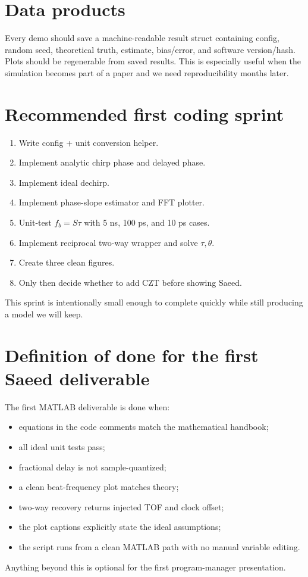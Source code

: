 \documentclass[11pt]{article}
\begin{document}
\section{Data products}
Every demo should save a machine-readable result struct containing config, random seed, theoretical truth, estimate, bias/error, and software version/hash. Plots should be regenerable from saved results. This is especially useful when the simulation becomes part of a paper and we need reproducibility months later.

\section{Recommended first coding sprint}
\begin{enumerate}
\item Write config + unit conversion helper.
\item Implement analytic chirp phase and delayed phase.
\item Implement ideal dechirp.
\item Implement phase-slope estimator and FFT plotter.
\item Unit-test $f_b=S\tau$ with 5 ns, 100 ps, and 10 ps cases.
\item Implement reciprocal two-way wrapper and solve $\tau,\theta$.
\item Create three clean figures.
\item Only then decide whether to add CZT before showing Saeed.
\end{enumerate}
This sprint is intentionally small enough to complete quickly while still producing a model we will keep.

\section{Definition of done for the first Saeed deliverable}
The first MATLAB deliverable is done when:
\begin{itemize}
\item equations in the code comments match the mathematical handbook;
\item all ideal unit tests pass;
\item fractional delay is not sample-quantized;
\item a clean beat-frequency plot matches theory;
\item two-way recovery returns injected TOF and clock offset;
\item the plot captions explicitly state the ideal assumptions;
\item the script runs from a clean MATLAB path with no manual variable editing.
\end{itemize}
Anything beyond this is optional for the first program-manager presentation.
\end{document}
